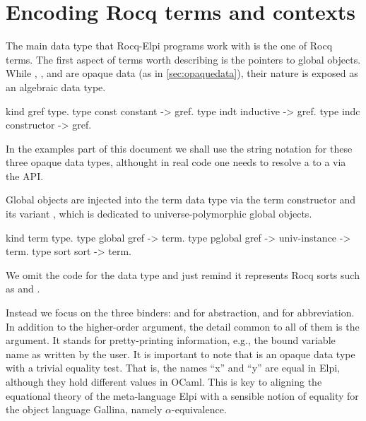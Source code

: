 \documentclass{these-ISSS}
\newenvironment{elpicode}
  {\VerbatimEnvironment\begin{elpibox}\begin{xelpicode}}{\end{xelpicode}
\end{elpibox}}
\begin{document}
\section{Encoding Rocq terms and contexts}\label{GALLINA}


The main data type that Rocq-Elpi programs work with is the one of Rocq terms. The
first aspect of terms worth describing is the pointers to global objects.
While , , and  are opaque
data (as in \cref{sec:opaquedata}), their nature is exposed as an algebraic
data type.

\begin{elpicode}
kind gref type.
type const constant -> gref.            %
type indt  inductive -> gref.           %
type indc  constructor -> gref.         %
\end{elpicode}

\noindent
In the examples part of this document we shall use the string notation for
these three opaque data types, althought in real code one needs to resolve
a  to a  via the  API.

Global objects are injected into the term data type via the  term
constructor and its variant , which is dedicated to
universe-polymorphic global objects.

\begin{elpicode}
kind term type.
type global  gref -> term.
type pglobal gref -> univ-instance -> term.
type sort    sort -> term.                 %
\end{elpicode}

\noindent
We omit the code for the  data type and just remind it
represents Rocq sorts such as  and .

Instead we focus on the three
binders:  and  for abstraction, and  for
abbreviation. In addition to the higher-order argument, the detail common to
all of them is the  argument. It stands for pretty-printing
information, e.g., the bound variable name as written by the user. It is important
to note that  is an opaque data type with a trivial equality test.
That is, the names ``x'' and ``y'' are equal in Elpi, although they hold
different values in OCaml. This is key to aligning the equational theory of
the meta-language Elpi with a sensible notion of equality for the object
language Gallina, namely $\alpha$-equivalence.
\end{document}
